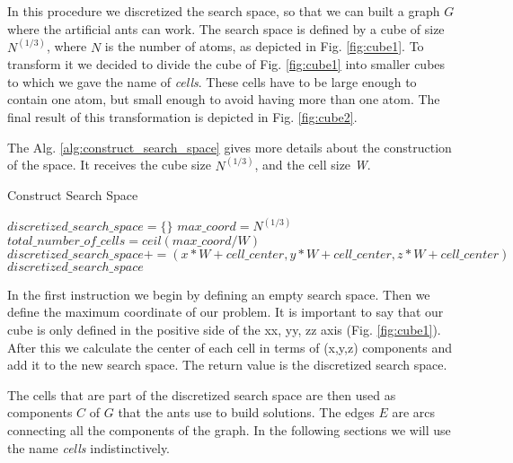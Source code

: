 	In this procedure we discretized the search space, so that we can built a graph $G$ where the artificial ants can work.
	The search space is defined by a cube of size $N^{(1/3)}$, where $N$ is the number of atoms, as depicted in Fig. \ref{fig:cube1}. To transform it we decided to divide the cube of Fig. \ref{fig:cube1} into smaller cubes to which we gave the name of \emph{cells}. These cells have to be large enough to contain one atom, but small enough to avoid having more than one atom. The final result of this transformation is depicted in Fig. \ref{fig:cube2}.  
	
	
	\pagebreak
	The Alg. \ref{alg:construct_search_space} gives more details about the construction of the space. It receives the cube size $N^{(1/3)}$, and the cell size \emph{W}.
	
	\begin{algorithm}
		\caption{Construct Search Space}
		\label{alg:construct_search_space}
		\begin{algorithmic}
		\STATE $discretized\_search\_space = \{\}$
		\STATE $max\_coord = N^{(1/3)}$
		\STATE $total\_number\_of\_cells = ceil(max\_coord / W)$
					\STATE $discretized\_search\_space += (x * W + cell\_center,  y * W + cell\_center, z * W + cell\_center)$
				\ENDFOR
			\ENDFOR
		\ENDFOR
		\RETURN $discretized\_search\_space$
		\end{algorithmic}
	\end{algorithm}

	In the first instruction we begin by defining an empty search space. Then we define the maximum coordinate of our problem. It is important to say that our cube is only defined in the positive side of the xx, yy, zz axis (Fig. \ref{fig:cube1}). After this we calculate the center of each cell in terms of (x,y,z) components and add it to the new search space. 
	The return value is the discretized search space.
	
	The cells that are part of the discretized search space are then used as components $C$ of $G$ that the ants use to build solutions. The edges $E$ are arcs connecting all the components of the graph. In the following sections we will use the name \emph{cells} indistinctively.
	
